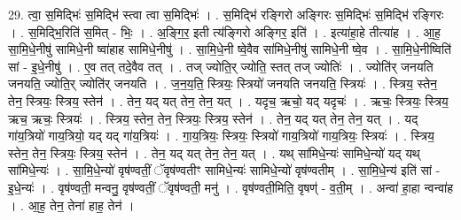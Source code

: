 \documentclass[17pt]{extarticle}
\begin{document}
29. त्वा॒ स॒मिद्भिः॑ स॒मिद्भि॑ स्त्वा त्वा स॒मिद्भिः॑ । . स॒मिद्भि॑ रङ्गिरो अङ्गिरः स॒मिद्भिः॑ स॒मिद्भि॑ रङ्गिरः । . स॒मिद्भि॒रिति॑ स॒मित् - भिः॒ । . अ॒ङ्गि॒र॒ इती त्य॑ङ्गिरो अङ्गिर॒ इति॑ । . इत्या॑हा॒हे तीत्या॑ह । . आ॒ह॒ सा॒मि॒धे॒नीषु॑ सामिधे॒नी ष्वा॑हाह सामिधे॒नीषु॑ । . सा॒मि॒धे॒नी ष्वे॒वैव सा॑मिधे॒नीषु॑ सामिधे॒नी ष्वे॒व । . सा॒मि॒धे॒नीष्विति॑ सां - इ॒धे॒नीषु॑ । . ए॒व तत् तदे॒वैव तत् । . तज् ज्योति॒र् ज्योति॒ स्तत् तज् ज्योतिः॑ । . ज्योति॑र् जनयति जनयति॒ ज्योति॒र् ज्योति॑र् जनयति । . ज॒न॒य॒ति॒ स्त्रियः॒ स्त्रियो॑ जनयति जनयति॒ स्त्रियः॑ । . स्त्रिय॒ स्तेन॒ तेन॒ स्त्रियः॒ स्त्रिय॒ स्तेन॑ । . तेन॒ यद् यत् तेन॒ तेन॒ यत् । . यदृच॒ ऋचो॒ यद् यदृचः॑ । . ऋचः॒ स्त्रियः॒ स्त्रिय॒ ऋच॒ ऋचः॒ स्त्रियः॑ । . स्त्रिय॒ स्तेन॒ तेन॒ स्त्रियः॒ स्त्रिय॒ स्तेन॑ । . तेन॒ यद् यत् तेन॒ तेन॒ यत् । . यद् गा॑य॒त्रियो॑ गाय॒त्रियो॒ यद् यद् गा॑य॒त्रियः॑ । . गा॒य॒त्रियः॒ स्त्रियः॒ स्त्रियो॑ गाय॒त्रियो॑ गाय॒त्रियः॒ स्त्रियः॑ । . स्त्रिय॒ स्तेन॒ तेन॒ स्त्रियः॒ स्त्रिय॒ स्तेन॑ । . तेन॒ यद् यत् तेन॒ तेन॒ यत् । . यथ् सा॑मिधे॒न्यः॑ सामिधे॒न्यो॑ यद् यथ् सा॑मिधे॒न्यः॑ । . सा॒मि॒धे॒न्यो॑ वृष॑ण्वतीं॒ ॅवृष॑ण्वतीꣳ सामिधे॒न्यः॑ सामिधे॒न्यो॑ वृष॑ण्वतीम् । . सा॒मि॒धे॒न्य॑ इति॑ सां - इ॒धे॒न्यः॑ । . वृष॑ण्वती॒ मन्वनु॒ वृष॑ण्वतीं॒ ॅवृष॑ण्वती॒ मनु॑ । . वृष॑ण्वती॒मिति॒ वृषण्॑ - व॒ती॒म् । . अन्वा॑ हा॒हा न्वन्वा॑ह । . आ॒ह॒ तेन॒ तेना॑ हाह॒ तेन॑ । \newline
\end{document}
